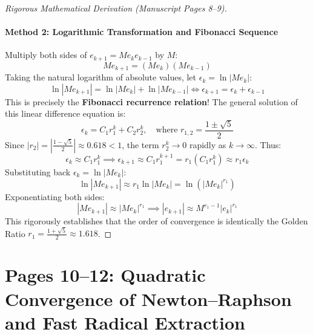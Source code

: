 \begin{proof}[Rigorous Mathematical Derivation (Manuscript Pages 8--9)]
\paragraph{Method 2: Logarithmic Transformation and Fibonacci Sequence}
Multiply both sides of $e_{k+1} = M e_k e_{k-1}$ by $M$:
\begin{equation}
    M e_{k+1} = (M e_k)(M e_{k-1})
\end{equation}
Taking the natural logarithm of absolute values, let $\epsilon_k = \ln|M e_k|$:
\begin{equation}
    \ln|M e_{k+1}| = \ln|M e_k| + \ln|M e_{k-1}| \iff \boxed{\epsilon_{k+1} = \epsilon_k + \epsilon_{k-1}}
\end{equation}
This is precisely the \textbf{Fibonacci recurrence relation}!
The general solution of this linear difference equation is:
\begin{equation}
    \epsilon_k = C_1 r_1^k + C_2 r_2^k, \quad \text{where } r_{1,2} = \frac{1 \pm \sqrt{5}}{2}
\end{equation}
Since $|r_2| = \left|\frac{1-\sqrt{5}}{2}\right| \approx 0.618 < 1$, the term $r_2^k \to 0$ rapidly as $k \to \infty$. Thus:
\begin{equation}
    \epsilon_k \approx C_1 r_1^k \implies \epsilon_{k+1} \approx C_1 r_1^{k+1} = r_1 (C_1 r_1^k) \approx r_1 \epsilon_k
\end{equation}
Substituting back $\epsilon_k = \ln|M e_k|$:
\begin{equation}
    \ln|M e_{k+1}| \approx r_1 \ln|M e_k| = \ln\left(|M e_k|^{r_1}\right)
\end{equation}
Exponentiating both sides:
\begin{equation}
    |M e_{k+1}| \approx |M e_k|^{r_1} \implies |e_{k+1}| \approx M^{r_1 - 1} |e_k|^{r_1}
\end{equation}
This rigorously establishes that the order of convergence is identically the Golden Ratio $r_1 = \frac{1+\sqrt{5}}{2} \approx 1.618$.
\end{proof}

\section{Pages 10--12: Quadratic Convergence of Newton--Raphson and Fast Radical Extraction}
\label{sec:page10_12_nr_convergence}

